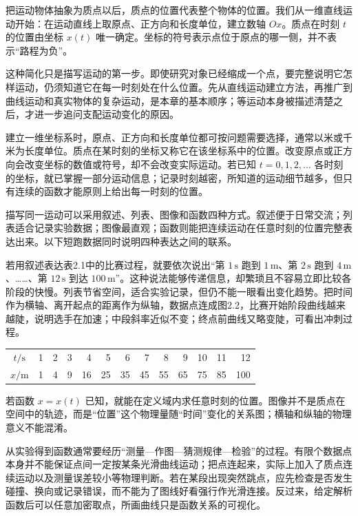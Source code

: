 
把运动物体抽象为质点以后，质点的位置代表整个物体的位置。我们从一维直线运动开始：在运动直线上取原点、正方向和长度单位，建立数轴 $Ox$。质点在时刻 $t$ 的位置由坐标 $x(t)$ 唯一确定。坐标的符号表示点位于原点的哪一侧，并不表示“路程为负”。

这种简化只是描写运动的第一步。即使研究对象已经缩成一个点，要完整说明它怎样运动，仍须知道它在每一时刻处在什么位置。先从直线运动建立方法，再推广到曲线运动和真实物体的复杂运动，是本章的基本顺序；等运动本身被描述清楚之后，才进一步追问支配运动变化的原因。

建立一维坐标系时，原点、正方向和长度单位都可按问题需要选择，通常以米或千米为长度单位。质点在某时刻的坐标又称它在该坐标系中的位置。改变原点或正方向会改变坐标的数值或符号，却不会改变实际运动。若已知 $t=0,1,2,\ldots$ 各时刻的坐标，就已掌握一部分运动信息；记录时刻越密，所知道的运动细节越多，但只有连续的函数才能原则上给出每一时刻的位置。

描写同一运动可以采用叙述、列表、图像和函数四种方式。叙述便于日常交流；列表适合记录实验数据；图像最直观；函数则能把连续运动在任意时刻的位置完整表达出来。以下短跑数据同时说明四种表达之间的联系。

若用叙述表达表2.1中的比赛过程，就要依次说出“第 $1\,\mathrm{s}$ 跑到 $1\,\mathrm{m}$、第 $2\,\mathrm{s}$ 跑到 $4\,\mathrm{m}$、……、第 $12\,\mathrm{s}$ 到达 $100\,\mathrm{m}$”。这种说法能够传递信息，却繁琐且不容易立即比较各阶段的快慢。列表节省空间，适合实验记录，但仍不能一眼看出变化趋势。把时间作为横轴、离开起点的距离作为纵轴，数据点连成图2.2，比赛开始阶段曲线越来越陡，说明选手在加速；中段斜率近似不变；终点前曲线又略变陡，可看出冲刺过程。

\begin{center}\small
\begin{tabular}{c*{12}{r}}
\toprule
$t/\mathrm{s}$&1&2&3&4&5&6&7&8&9&10&11&12\\
$x/\mathrm{m}$&1&4&9&16&25&35&45&55&65&75&85&100\\
\bottomrule
\end{tabular}
\end{center}

\SprintGraph

若函数 $x=x(t)$ 已知，就能在定义域内求任意时刻的位置。图像并不是质点在空间中的轨迹，而是“位置”这个物理量随“时间”变化的关系图；横轴和纵轴的物理意义不能混淆。

从实验得到函数通常要经历“测量—作图—猜测规律—检验”的过程。有限个数据点本身并不能保证点间一定按某条光滑曲线运动；把点连起来，实际上加入了质点连续运动以及测量误差较小等物理判断。若在某段出现突然跳点，应先检查是否发生碰撞、换向或记录错误，而不能为了图线好看强行作光滑连接。反过来，给定解析函数后可以任意加密取点，所画曲线只是函数关系的可视化。

